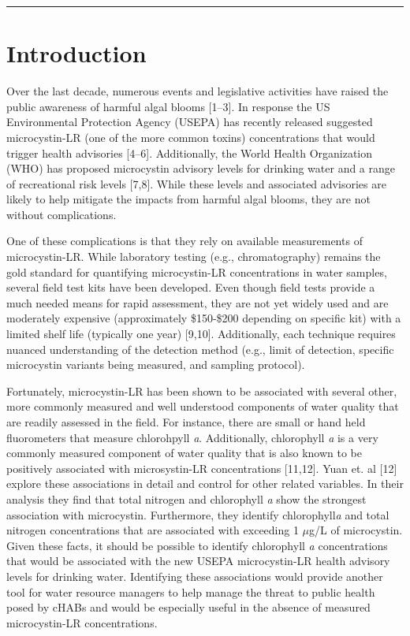 \documentclass[10pt,a4paper,twocolumn]{article}
\begin{document}
\vspace{3mm}

\hrule

\doublespace

\section{Introduction}\label{introduction}

Over the last decade, numerous events and legislative activities have
raised the public awareness of harmful algal blooms {[}1--3{]}. In
response the US Environmental Protection Agency (USEPA) has recently
released suggested microcystin-LR (one of the more common toxins)
concentrations that would trigger health advisories {[}4--6{]}.
Additionally, the World Health Organization (WHO) has proposed
microcystin advisory levels for drinking water and a range of
recreational risk levels {[}7,8{]}. While these levels and associated
advisories are likely to help mitigate the impacts from harmful algal
blooms, they are not without complications.

One of these complications is that they rely on available measurements
of microcystin-LR. While laboratory testing (e.g., chromatography)
remains the gold standard for quantifying microcystin-LR concentrations
in water samples, several field test kits have been developed. Even
though field tests provide a much needed means for rapid assessment,
they are not yet widely used and are moderately expensive (approximately
\$150-\$200 depending on specific kit) with a limited shelf life
(typically one year) {[}9,10{]}. Additionally, each technique requires
nuanced understanding of the detection method (e.g., limit of detection,
specific microcystin variants being measured, and sampling protocol).

Fortunately, microcystin-LR has been shown to be associated with several
other, more commonly measured and well understood components of water
quality that are readily assessed in the field. For instance, there are
small or hand held fluorometers that measure chlorohpyll \emph{a}.
Additionally, chlorophyll \emph{a} is a very commonly measured component
of water quality that is also known to be positively associated with
microsystin-LR concentrations {[}11,12{]}. Yuan et. al {[}12{]} explore
these associations in detail and control for other related variables. In
their analysis they find that total nitrogen and chlorophyll \emph{a}
show the strongest association with microcystin. Furthermore, they
identify chlorophyll\emph{a} and total nitrogen concentrations that are
associated with exceeding 1 \(\mu\)g/L of microcystin. Given these
facts, it should be possible to identify chlorophyll \emph{a}
concentrations that would be associated with the new USEPA
microcystin-LR health advisory levels for drinking water. Identifying
these associations would provide another tool for water resource
managers to help manage the threat to public health posed by cHABs and
would be especially useful in the absence of measured microcystin-LR
concentrations.
\end{document}
